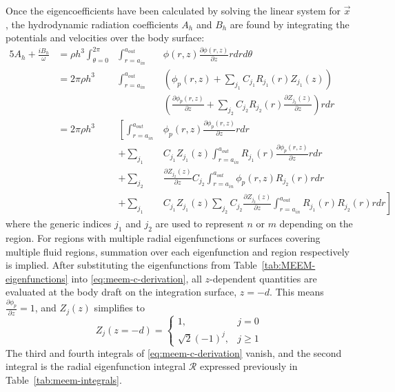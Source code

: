 \begin{appendices}
Once the eigencoefficients have been calculated by solving the linear system for $\vec{x}$, the hydrodynamic radiation coefficients $A_h$ and $B_h$ are found by integrating the potentials and velocities over the body surface:
\begin{alignat}{5}\label{eq:meem-c-derivation}
    A_h + \frac{iB_h}{\omega}&=\rho h^3  \int_{\theta=0}^{2\pi} & \int_{r=a_{in}}^{a_{out}} &\phi(r,z) \frac{\partial \phi(r,z)}{\partial z}r dr d\theta  \nonumber \\
    &= 2\pi \rho h^3 & \int_{r=a_{in}}^{a_{out}}&
   \left(\phi_p(r,z) + \sum_{j_1} C_{j_1} R_{j_1}(r)Z_{j_1}(z)\right) \nonumber \\
  & & &  \left(\frac{\partial \phi_p(r,z)}{\partial z} + \sum_{j_2} C_{j_2} R_{j_2}(r)\frac{\partial Z_{j_2}(z)}{\partial z} \right)r dr \nonumber \\
    &= 2\pi \rho h^3 & \left[
    \int_{r=a_{in}}^{a_{out}} \right. & \left.\phi_p(r,z)\frac{\partial \phi_p(r,z)}{\partial z} rdr  \right.  \\
   & &  + \sum_{j_1} &C_{j_1} Z_{j_1}(z)\int_{r=a_{in}}^{a_{out}}R_{j_1}(r)\frac{\partial \phi_p(r,z)}{\partial z}rdr \nonumber \\
    &&   + \sum_{j_2}& \frac{\partial Z_{j_2}(z)}{\partial z} C_{j_2}\int_{r=a_{in}}^{a_{out}}\phi_p(r,z)  R_{j_2}(r)rdr \nonumber \\
   & & +  \sum_{j_1}& \left. C_{j_1}Z_{j_1}(z) \sum_{j_2} C_{j_2} \frac{\partial Z_{j_2}(z)}{\partial z}\int_{r=a_{in}}^{a_{out}} R_{j_1}(r)R_{j_2}(r)rdr\right] \nonumber
\end{alignat}
where the generic indices $j_1$ and $j_2$ are used to represent $n$ or $m$ depending on the region. For regions with multiple radial eigenfunctions or surfaces covering multiple fluid regions, summation over each eigenfunction and region respectively is implied. After substituting the eigenfunctions from Table~\ref{tab:MEEM-eigenfunctions} into \ref{eq:meem-c-derivation}, all $z$-dependent quantities are evaluated at the body draft on the integration surface, $z=-d$. This means $\frac{\partial \phi_p}{\partial z}=1$, and $Z_j(z)$ simplifies to
\begin{equation}
    Z_j(z=-d) = \begin{cases}1,& j=0\\ \sqrt2(-1)^j,& j \geq 1\end{cases}
\end{equation}
The third and fourth integrals of \ref{eq:meem-c-derivation} vanish, and the second integral is the radial eigenfunction integral $\boldsymbol{\mathcal{R}}$ expressed previously in Table~\ref{tab:meem-integrals}. 


\end{appendices}
